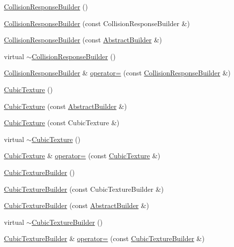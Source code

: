 \begin{DoxyCompactItemize}
\item 
\hyperlink{namespacejli_aba46547ac77fd775617b1e9c5c4c3807}{Collision\+Response\+Builder} ()
\item 
\hyperlink{namespacejli_ade55a82bdee00c30fda3b15d26caca25}{Collision\+Response\+Builder} (const Collision\+Response\+Builder \&)
\item 
\hyperlink{namespacejli_a921545297d17ff8c23fcab0bb4a2a67f}{Collision\+Response\+Builder} (const \hyperlink{classjli_1_1_abstract_builder}{Abstract\+Builder} \&)
\item 
virtual \hyperlink{namespacejli_a92b1a214131802c7cde48d0908a810e1}{$\sim$\+Collision\+Response\+Builder} ()
\item 
\hyperlink{namespacejli_aba46547ac77fd775617b1e9c5c4c3807}{Collision\+Response\+Builder} \& \hyperlink{namespacejli_ad3d3c1fad0e4aea9e098049aded55a07}{operator=} (const \hyperlink{namespacejli_aba46547ac77fd775617b1e9c5c4c3807}{Collision\+Response\+Builder} \&)
\item 
\hyperlink{namespacejli_a1d29d42a67cba1e824b2bbef37ad3ac7}{Cubic\+Texture} ()
\item 
\hyperlink{namespacejli_afcdf119bfd2e7541a5d202805d6f07ad}{Cubic\+Texture} (const \hyperlink{classjli_1_1_abstract_builder}{Abstract\+Builder} \&)
\item 
\hyperlink{namespacejli_a224b5438fe535ded0127d92bd9e595dc}{Cubic\+Texture} (const Cubic\+Texture \&)
\item 
virtual \hyperlink{namespacejli_a64fcdd5d3fead8d1be7f29da5ee2d330}{$\sim$\+Cubic\+Texture} ()
\item 
\hyperlink{namespacejli_a1d29d42a67cba1e824b2bbef37ad3ac7}{Cubic\+Texture} \& \hyperlink{namespacejli_ad7545b9768425cea8f01be5265c970c8}{operator=} (const \hyperlink{namespacejli_a1d29d42a67cba1e824b2bbef37ad3ac7}{Cubic\+Texture} \&)
\item 
\hyperlink{namespacejli_a2a86125c6b724a9338c6950c2d88ba63}{Cubic\+Texture\+Builder} ()
\item 
\hyperlink{namespacejli_a5f17b78a514c78975beb02040161f8f7}{Cubic\+Texture\+Builder} (const Cubic\+Texture\+Builder \&)
\item 
\hyperlink{namespacejli_a2640ff46287ef90c9cbe4d81d3e87c46}{Cubic\+Texture\+Builder} (const \hyperlink{classjli_1_1_abstract_builder}{Abstract\+Builder} \&)
\item 
virtual \hyperlink{namespacejli_aa2eeb6eccc9f5dd78d8a050d1c00eafc}{$\sim$\+Cubic\+Texture\+Builder} ()
\item 
\hyperlink{namespacejli_a2a86125c6b724a9338c6950c2d88ba63}{Cubic\+Texture\+Builder} \& \hyperlink{namespacejli_a23318afe35b09c9c6d4fb466724ad63a}{operator=} (const \hyperlink{namespacejli_a2a86125c6b724a9338c6950c2d88ba63}{Cubic\+Texture\+Builder} \&)

\end{DoxyCompactItemize}
